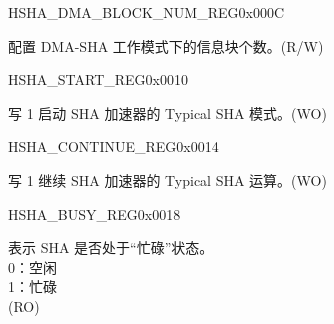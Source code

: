 \begin{register}{H}{SHA\_DMA\_BLOCK\_NUM\_REG}{0x000C}\label{regdesc:SHADMABLOCKNUMREG}
%
%
\regnewline%
\begin{regdesc}\begin{reglist}
\label{fielddesc:SHADMABLOCKNUM}\item [SHA\_DMA\_BLOCK\_NUM] 配置 DMA-SHA 工作模式下的信息块个数。(R/W)
\end{reglist}\end{regdesc}
\end{register}

\begin{register}{H}{SHA\_START\_REG}{0x0010}\label{regdesc:SHASTARTREG}
%
%
\regnewline%
\begin{regdesc}\begin{reglist}
\label{fielddesc:SHASTART}\item [SHA\_START] 写 1 启动 SHA 加速器的 Typical SHA 模式。(WO)
\end{reglist}\end{regdesc}
\end{register}


\begin{register}{H}{SHA\_CONTINUE\_REG}{0x0014}\label{regdesc:SHACONTINUEREG}
%
%
\regnewline%
\begin{regdesc}\begin{reglist}
\label{fielddesc:SHACONTINUE}\item [SHA\_CONTINUE] 写 1 继续 SHA 加速器的 Typical SHA 运算。(WO)
\end{reglist}\end{regdesc}
\end{register}


\begin{register}{H}{SHA\_BUSY\_REG}{0x0018}\label{regdesc:SHABUSYREG}
%
%
\regnewline%
\begin{regdesc}\begin{reglist}
\label{fielddesc:SHABUSYSTATE}\item [SHA\_BUSY\_STATE] 表示 SHA 是否处于“忙碌”状态。\\
0：空闲\\
1：忙碌 \\
(RO)
\end{reglist}\end{regdesc}
\end{register}


